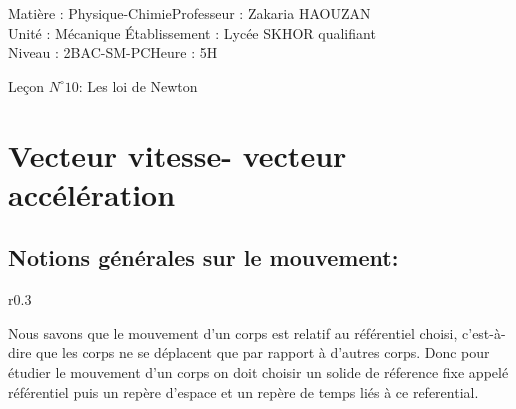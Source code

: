 \documentclass[12pt]{article}
\author{Zakaria HAOUZAN}
\date{\today}
\newcommand\headerMe[2]{\noindent{}#1\hfill#2}
\begin{document}
\headerMe{Matière : Physique-Chimie}{Professeur : Zakaria HAOUZAN}\\
\headerMe{Unité : Mécanique }{Établissement : Lycée SKHOR qualifiant}\\
\headerMe{Niveau : 2BAC-SM-PC}{Heure : 5H}\\

\begin{center}

    \Large{Leçon $N^{\circ} 10 $: \color{red}Les loi de Newton}
\end{center}



\section{Vecteur vitesse- vecteur accélération}
\subsection{Notions générales sur le mouvement:}

\begin{wrapfigure}[1]{r}{0.3\textwidth}
	\vspace{-5cm}
\end{wrapfigure}
Nous savons que le mouvement d'un corps est relatif au référentiel choisi, c'est-à-dire que les corps ne se déplacent
que par rapport à d'autres corps.
Donc pour étudier le mouvement d'un corps on doit choisir un solide de réference fixe appelé référentiel puis un repère d'espace et un repère de temps liés à ce referential.
\end{document}
